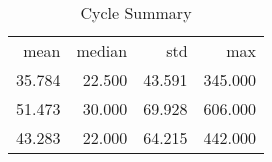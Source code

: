 \begin{table}[ht]
\centering
\caption{Cycle Summary} 
\begin{tabular}{rrrr}
 mean & median & std & max \\ 
 35.784 & 22.500 & 43.591 & 345.000 \\ 
   \hline
51.473 & 30.000 & 69.928 & 606.000 \\ 
  43.283 & 22.000 & 64.215 & 442.000 \\ 
  \end{tabular}
\end{table}
